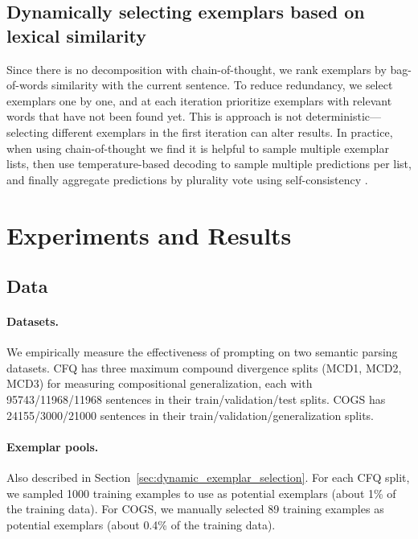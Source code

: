 \documentclass{article} \usepackage{iclr2022_conference,times}
\begin{document}
\subsection{Dynamically selecting exemplars based on lexical similarity \label{sec:factored_search}}

Since there is no decomposition with chain-of-thought, we rank exemplars by bag-of-words similarity with the current sentence. To reduce redundancy, we select exemplars one by one, and at each iteration prioritize exemplars with relevant words that have not been found yet. This is approach is not deterministic---selecting different exemplars in the first iteration can alter results. In practice, when using chain-of-thought we find it is helpful to sample multiple exemplar lists, then use temperature-based decoding to sample multiple predictions per list, and finally aggregate predictions by plurality vote using self-consistency \citep{wang2022selfconsistency,shi2022codetranslation,li2022diverse}.

\section{Experiments and Results}

\subsection{Data \label{sec:data}}

\paragraph{Datasets.} We empirically measure the effectiveness of prompting on two semantic parsing datasets. CFQ \citep{Keysers2020MeasuringCG} has three maximum compound divergence splits (MCD1, MCD2, MCD3) for measuring compositional generalization, each with 95743/11968/11968 sentences in their train/validation/test splits. COGS \citep{kim-linzen-2020-cogs} has 24155/3000/21000 sentences in their train/validation/generalization splits. 

\paragraph{Exemplar pools.} Also described in Section~\ref{sec:dynamic_exemplar_selection}. For each CFQ split, we sampled 1000 training examples to use as potential exemplars (about 1\% of the training data). For COGS, we manually selected 89 training examples as potential exemplars (about 0.4\% of the training data).
\end{document}
